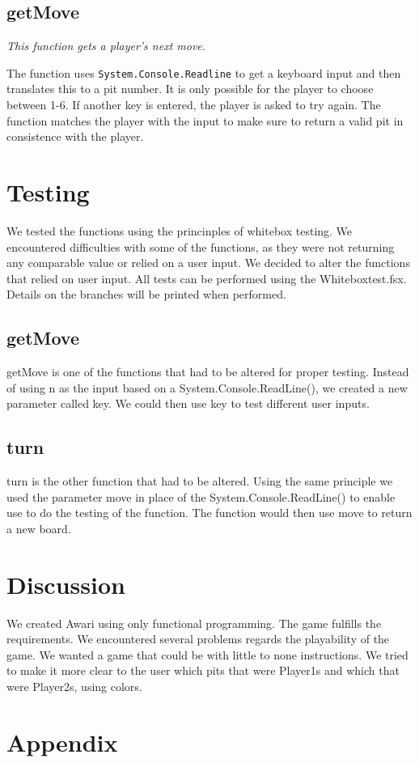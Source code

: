 \documentclass[a4paper]{report}
\begin{document}
\subsection*{getMove} 
{\it This function gets a player's next move.}

The function uses \texttt{System.Console.Readline} to get a keyboard input and then translates this to a pit number. It is only possible for the player to choose between 1-6. If another key is entered, the player is asked to try again. The function matches the player with the input to make sure to return a valid pit in consistence with the player.
\\
\section*{Testing}
We tested the functions using the princinples of whitebox testing. We encountered difficulties with some of the functions, as they were not returning any comparable value or relied on a user input.
We decided to alter the functions that relied on user input. All tests can be performed using the Whiteboxtest.fsx. Details on the branches will be printed when performed.

\subsection*{getMove}
getMove is one of the functions that had to be altered for proper testing. Instead of using n as the input based on a System.Console.ReadLine(), we created a new parameter called key.
We could then use key to test different user inputs.


\subsection*{turn}
turn is the other function that had to be altered. Using the same principle we used the parameter move in place of the System.Console.ReadLine() to enable use to do the testing of the function. The function would then use move
to return a new board.


\section*{Discussion}
We created Awari using only functional programming. The game fulfills the requirements. We encountered several problems regards the playability of the game. We wanted a game that could be with little to none
instructions. We tried to make it more clear to the user which pits that were Player1s and which that were Player2s, using colors.
\section*{Appendix}
\lstset{language=FSharp}

\end{document}
